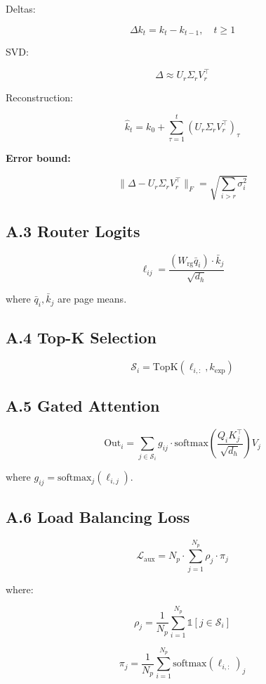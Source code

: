 Deltas:

\[
\Delta k_t = k_t - k_{t-1}, \quad t \geq 1
\tag{A.4}
\]

SVD:

\[
\Delta \approx U_r \Sigma_r V_r^\top
\tag{A.5}
\]

Reconstruction:

\[
\hat{k}_t = k_0 + \sum_{\tau=1}^t (U_r \Sigma_r V_r^\top)_\tau
\tag{A.6}
\]

\textbf{Error bound:}

\[
\|\Delta - U_r \Sigma_r V_r^\top\|_F = \sqrt{\sum_{i > r} \sigma_i^2}
\tag{A.7}
\]

\subsection{A.3 Router Logits}

\[
\ell_{ij} = \frac{(W_\text{rg} \bar{q}_i) \cdot \bar{k}_j}{\sqrt{d_h}}
\tag{A.8}
\]

where $\bar{q}_i, \bar{k}_j$ are page means.

\subsection{A.4 Top-K Selection}

\[
\mathcal{S}_i = \text{TopK}(\ell_{i, :}, k_\text{exp})
\tag{A.9}
\]

\subsection{A.5 Gated Attention}

\[
\text{Out}_i = \sum_{j \in \mathcal{S}_i} g_{ij} \cdot \text{softmax}\!\left(\frac{Q_i K_j^\top}{\sqrt{d_h}}\right) V_j
\tag{A.10}
\]

where $g_{ij} = \text{softmax}_j(\ell_{i, j})$.

\subsection{A.6 Load Balancing Loss}

\[
\mathcal{L}_\text{aux} = N_p \cdot \sum_{j=1}^{N_p} \rho_j \cdot \pi_j
\tag{A.11}
\]

where:

\[
\rho_j = \frac{1}{N_p} \sum_{i=1}^{N_p} \mathbb{1}[j \in \mathcal{S}_i]
\tag{A.12}
\]

\[
\pi_j = \frac{1}{N_p} \sum_{i=1}^{N_p} \text{softmax}(\ell_{i, :})_j
\tag{A.13}
\]

